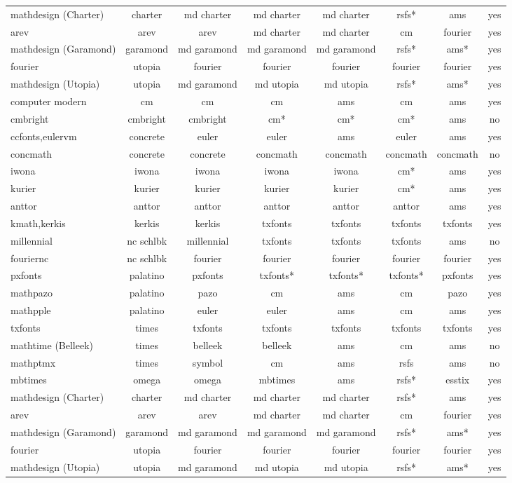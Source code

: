 \begin{landscape}
\begin{spacing}{1}
\begin{longtable}{lccccccc}
		mathdesign (Charter)&charter&md charter&md charter&md charter& rsfs* &ams&yes\\
		arev&arev&arev&md charter&md charter&cm&fourier&yes\\
		mathdesign (Garamond)&garamond&md garamond&md garamond&md garamond& rsfs* & ams* &yes\\
		fourier&utopia&fourier&fourier&fourier&fourier&fourier&yes\\
		mathdesign (Utopia)&utopia&md garamond&md utopia&md utopia&rsfs*&ams*&yes\\
		computer modern&cm&cm&cm&ams&cm&ams&yes\\
		cmbright&cmbright&cmbright&cm*&cm*&cm*&ams&no\\
		ccfonts,eulervm&concrete&euler&euler&ams&euler&ams&yes\\
		concmath&concrete&concrete&concmath&concmath&concmath&concmath&no\\
		iwona&iwona&iwona&iwona&iwona&cm*&ams&yes\\
		kurier&kurier&kurier&kurier&kurier&cm*&ams&yes\\
		anttor&anttor&anttor&anttor&anttor&anttor&ams&yes\\
		kmath,kerkis&kerkis&kerkis&txfonts&txfonts&txfonts&txfonts&yes\\
		millennial&nc schlbk&millennial&txfonts&txfonts&txfonts&ams&no\\
		fouriernc&nc schlbk&fourier&fourier&fourier&fourier&fourier&yes\\
		pxfonts&palatino&pxfonts&txfonts*&txfonts*&txfonts*&pxfonts&yes\\
		mathpazo&palatino&pazo&cm&ams&cm&pazo&yes\\
		mathpple&palatino&euler&euler&ams&cm&ams&yes\\
		txfonts&times&txfonts&txfonts&txfonts&txfonts&txfonts&yes\\
		mathtime (Belleek)&times&belleek&belleek&ams&cm&ams&no\\
		mathptmx&times&symbol&cm&ams&rsfs&ams&no\\
		mbtimes&omega&omega&mbtimes&ams&rsfs*&esstix&yes\\
		mathdesign (Charter)&charter&md charter&md charter&md charter& rsfs* &ams&yes\\
		arev&arev&arev&md charter&md charter&cm&fourier&yes\\
		mathdesign (Garamond)&garamond&md garamond&md garamond&md garamond& rsfs* & ams* &yes\\
		fourier&utopia&fourier&fourier&fourier&fourier&fourier&yes\\
		mathdesign (Utopia)&utopia&md garamond&md utopia&md utopia&rsfs*&ams*&yes\\
	\end{longtable}
\end{spacing}
\end{landscape}

